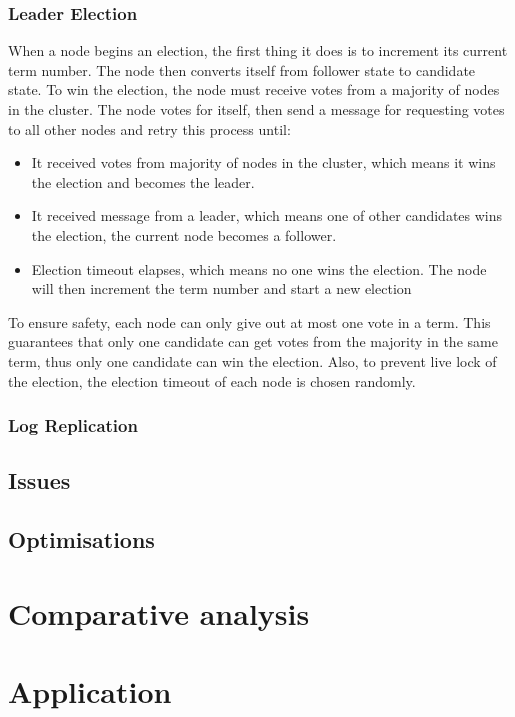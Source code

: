 \documentclass[12pt, a4paper]{article}
\begin{document}
  \subsubsection{Leader Election}
  When a node begins an election, the first thing it does is to increment its current term number. The node then converts itself from
  follower state to candidate state. To win the election, the node must receive votes from a majority of nodes in the cluster. The node
  votes for itself, then send a message for requesting votes to all other nodes and retry this process until:
  \begin{itemize}
    \item It received votes from majority of nodes in the cluster, which means it wins the election and becomes the leader.
    \item It received message from a leader, which means one of other candidates wins the election, the current node becomes a follower.
    \item Election timeout elapses, which means no one wins the election. The node will then increment the term number and start a new election
  \end{itemize}
  \par
  To ensure safety, each node can only give out at most one vote in a term. This guarantees that only one candidate can get votes from
  the majority in the same term, thus only one candidate can win the election. Also, to prevent live lock of the election, the election
  timeout of each node is chosen randomly.
  \subsubsection{Log Replication}
\subsection{Issues}

\subsection{Optimisations}


\section{Comparative analysis}


\section{Application}






\end{document}
